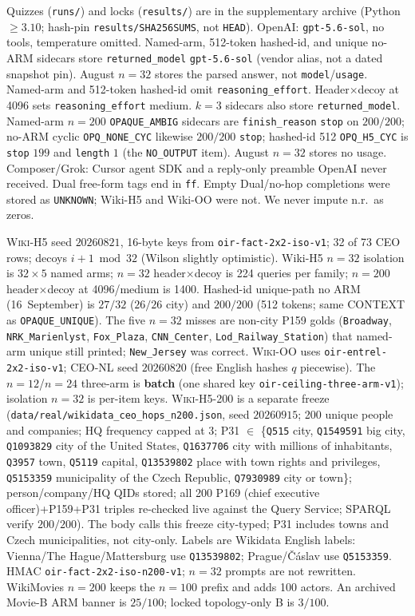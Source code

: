 \documentclass[10pt]{article} %
\begin{document}
Quizzes (\texttt{runs/}) and locks (\texttt{results/}) are in
the supplementary archive
(Python $\ge 3.10$; hash-pin \texttt{results/SHA256SUMS}, not \texttt{HEAD}).
OpenAI: \texttt{gpt-5.6-sol}, no tools, temperature omitted.
Named-arm, 512-token hashed-id, and unique no-ARM sidecars store
\texttt{returned\_model} \texttt{gpt-5.6-sol} (vendor alias, not a dated
snapshot pin). August $n{=}32$ stores the parsed answer, not
\texttt{model}/\texttt{usage}.
Named-arm and 512-token hashed-id omit \texttt{reasoning\_effort}.
Header$\times$decoy at 4096 sets \texttt{reasoning\_effort} medium.
$k{=}3$ sidecars also store \texttt{returned\_model}.
Named-arm $n{=}200$ \texttt{OPAQUE\_AMBIG} sidecars are
\texttt{finish\_reason} \texttt{stop} on $200/200$; no-ARM cyclic
\texttt{OPQ\_NONE\_CYC} likewise $200/200$ \texttt{stop}; hashed-id 512
\texttt{OPQ\_H5\_CYC} is \texttt{stop} $199$ and \texttt{length} $1$
(the \texttt{NO\_OUTPUT} item). August $n{=}32$ stores no usage.
Composer/Grok: Cursor agent SDK and a reply-only preamble OpenAI never
received. Dual free-form tags end in \texttt{ff}.
Empty Dual/no-hop completions were stored as \texttt{UNKNOWN}; Wiki-H5 and
Wiki-OO were not. We never impute n.r.\ as zeros.

\textsc{Wiki-H5} seed $20260821$, 16-byte keys from \texttt{oir-fact-2x2-iso-v1};
32 of 73 CEO rows; decoys $i{+}1 \bmod 32$ (Wilson slightly optimistic).
Wiki-H5 $n{=}32$ isolation is $32{\times}5$ named arms; $n{=}32$
header$\times$decoy is 224 queries per family; $n{=}200$ header$\times$decoy
at 4096/medium is 1400.
Hashed-id unique-path no ARM (16~September) is $27/32$ ($26/26$ city) and
$200/200$ (512 tokens; same CONTEXT as \texttt{OPAQUE\_UNIQUE}).
The five $n{=}32$ misses are non-city P159 golds
(\texttt{Broadway}, \texttt{NRK\_Marienlyst}, \texttt{Fox\_Plaza},
\texttt{CNN\_Center}, \texttt{Lod\_Railway\_Station}) that named-arm unique
still printed; \texttt{New\_Jersey} was correct.
\textsc{Wiki-OO} uses \texttt{oir-entrel-2x2-iso-v1}; CEO-NL seed $20260820$
(free English hashes $q$ piecewise).
The $n{=}12$/$n{=}24$ three-arm is \textbf{batch} (one shared key
\texttt{oir-ceiling-three-arm-v1}); isolation $n{=}32$ is per-item keys.
\textsc{Wiki-H5-200} is a separate freeze
(\texttt{data/real/wikidata\_ceo\_hops\_n200.json}, seed $20260915$;
200 unique people and companies; HQ frequency capped at 3;
P31 $\in$ \{\texttt{Q515} city, \texttt{Q1549591} big city,
\texttt{Q1093829} city of the United States,
\texttt{Q1637706} city with millions of inhabitants,
\texttt{Q3957} town, \texttt{Q5119} capital,
\texttt{Q13539802} place with town rights and privileges,
\texttt{Q5153359} municipality of the Czech Republic,
\texttt{Q7930989} city or town\};
person/company/HQ QIDs stored;
all 200 P169 (chief executive officer)+P159+P31 triples re-checked live
against the Query Service; SPARQL verify $200/200$).
The body calls this freeze city-typed; P31 includes towns and Czech
municipalities, not city-only.
Labels are Wikidata English labels: Vienna/The Hague/Mattersburg use
\texttt{Q13539802}; Prague/\v{C}\'aslav use \texttt{Q5153359}.
HMAC \texttt{oir-fact-2x2-iso-n200-v1};
$n{=}32$ prompts are not rewritten.
WikiMovies $n{=}200$ keeps the $n{=}100$ prefix and adds 100 actors.
An archived Movie-B ARM banner is $25/100$; locked topology-only B is
$3/100$.
\end{document}
